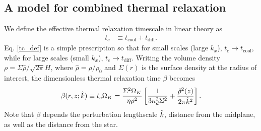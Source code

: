 \subsection{A model for combined thermal relaxation}\label{toy_relax}
We define the effective thermal relaxation timescale in linear theory as
\begin{align}\label{tc_def}
  t_c &\equiv t_\mathrm{cool} + t _\mathrm{diff}. %
\end{align}
Eq. \ref{tc_def} is a simple prescription so
that for small scales (large $k_x$), $t_c\to t_\mathrm{cool}$, while
for large scales (small $k_x$), $t_c\to t_\mathrm{diff}$. Writing the
volume density $\rho = \Sigma\hat{\rho}/\sqrt{2\pi}H$, where
$\hat{\rho} = \rho/\rho_0$ and $\Sigma(r)$ is the surface density at the
radius of interest, the dimensionless thermal
relaxation time $\beta$ becomes 
\begin{align}\label{real_beta}
  \beta(r,z;\hat{k}) \equiv t_c\Omega_K =
  \frac{\Sigma^2\Omega_K}{\eta\rho^2}\left[\frac{1}{3\kappa_d^2\Sigma^2} 
    + \frac{\hat{\rho}^2(z)}{2\pi \hat{k}^2}\right].
\end{align}
Note that $\beta$ depends the perturbation lengthscale $\hat{k}$,
distance from the midplane, as well as the distance from the star.  

